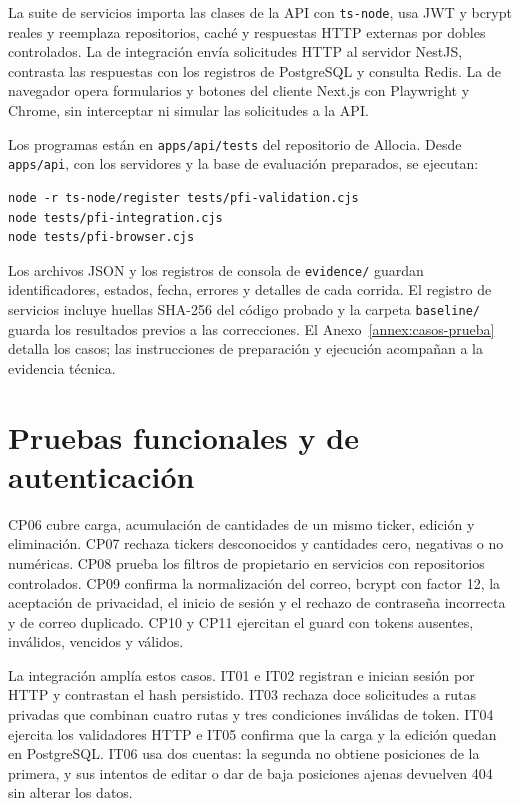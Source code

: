 La suite de servicios importa las clases de la API con \texttt{ts-node}, usa JWT y bcrypt reales y reemplaza repositorios, caché y respuestas HTTP externas por dobles controlados. La de integración envía solicitudes HTTP al servidor NestJS, contrasta las respuestas con los registros de PostgreSQL y consulta Redis. La de navegador opera formularios y botones del cliente Next.js con Playwright y Chrome, sin interceptar ni simular las solicitudes a la API.

Los programas están en \texttt{apps/api/tests} del repositorio de Allocia. Desde \texttt{apps/api}, con los servidores y la base de evaluación preparados, se ejecutan:
\begin{verbatim}
node -r ts-node/register tests/pfi-validation.cjs
node tests/pfi-integration.cjs
node tests/pfi-browser.cjs
\end{verbatim}
Los archivos JSON y los registros de consola de \texttt{evidence/} guardan identificadores, estados, fecha, errores y detalles de cada corrida. El registro de servicios incluye huellas SHA-256 del código probado y la carpeta \texttt{baseline/} guarda los resultados previos a las correcciones. El Anexo~\ref{annex:casos-prueba} detalla los casos; las instrucciones de preparación y ejecución acompañan a la evidencia técnica.

\section{Pruebas funcionales y de autenticación}\label{sec:pruebas-funcionales}

CP06 cubre carga, acumulación de cantidades de un mismo ticker, edición y eliminación. CP07 rechaza tickers desconocidos y cantidades cero, negativas o no numéricas. CP08 prueba los filtros de propietario en servicios con repositorios controlados. CP09 confirma la normalización del correo, bcrypt con factor 12, la aceptación de privacidad, el inicio de sesión y el rechazo de contraseña incorrecta y de correo duplicado. CP10 y CP11 ejercitan el guard con tokens ausentes, inválidos, vencidos y válidos.

La integración amplía estos casos. IT01 e IT02 registran e inician sesión por HTTP y contrastan el hash persistido. IT03 rechaza doce solicitudes a rutas privadas que combinan cuatro rutas y tres condiciones inválidas de token. IT04 ejercita los validadores HTTP e IT05 confirma que la carga y la edición quedan en PostgreSQL. IT06 usa dos cuentas: la segunda no obtiene posiciones de la primera, y sus intentos de editar o dar de baja posiciones ajenas devuelven 404 sin alterar los datos.

